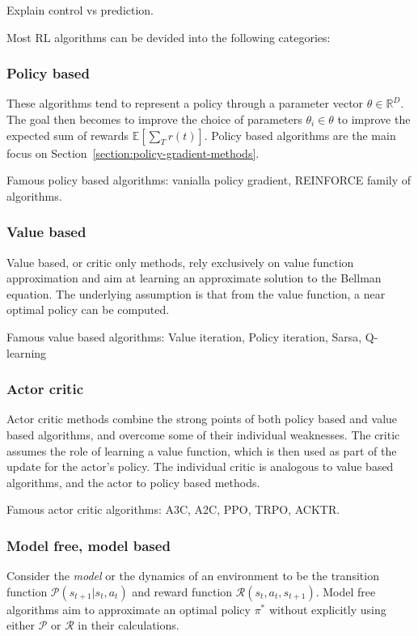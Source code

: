 \documentclass{../main.tex}{subfiles}
\begin{document}

Explain control vs prediction.

Most RL algorithms can be devided into the following categories:
\subsubsection{Policy based}
These algorithms tend to represent a policy through a parameter vector $\theta
\in \mathbb{R}^D$. The goal then becomes to improve the choice of parameters
$\theta_i \in \theta$ to improve the expected sum of rewards
$\mathbb{E}[\sum_{T} r(t)]$. Policy based algorithms are the main focus on Section~\ref{section:policy-gradient-methods}.

Famous policy based algorithms: vanialla policy gradient, REINFORCE family of algorithms\@.

\subsubsection{Value based}
Value based, or critic only methods, rely exclusively on value function approximation and aim at learning an approximate solution to the Bellman equation. The underlying assumption is that from the value function, a near optimal policy can be computed.

Famous value based algorithms: Value iteration, Policy iteration, Sarsa, Q-learning

\subsubsection{Actor critic}

Actor critic methods combine the strong points of both policy based and value based algorithms, and overcome some of their individual weaknesses. The critic assumes the role of learning a value function, which is then used as part of the update for the actor's policy. The individual critic is analogous to value based algorithms, and the actor to policy based methods.

Famous actor critic algorithms: A3C, A2C, PPO, TRPO, ACKTR\@.

\subsubsection{Model free, model based}
Consider the \textit{model} or the dynamics of an environment to be the transition function $\mathcal{P}(s_{t+1} | s_t, a_t)$ and reward function $\mathcal{R}(s_t, a_t, s_{t+1})$. Model free algorithms aim to approximate an optimal policy $\pi^*$ without explicitly using either $\mathcal{P}$ or $\mathcal{R}$ in their calculations.
\end{document}
